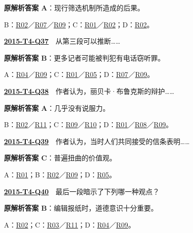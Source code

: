 \documentclass[11pt,a4paper]{article}
\begin{document}
\noindent\textbf{原解析答案 A}：现行筛选机制所造成的后果。\par\nopagebreak
\noindent B：\hyperref[cat-R02]{R02}／\hyperref[cat-R07]{R07}／\hyperref[cat-R09]{R09}；C：\hyperref[cat-R01]{R01}／\hyperref[cat-R02]{R02}；D：\hyperref[cat-R02]{R02}。\par\smallskip
{}\label{idx-2015-T4-Q37}\noindent\textbf{\href{https://zj139.github.io/math-notes/english/cdca5e792ad64d07196bc0ec/\#q37}{2015-T4-Q37}}　从第三段可以推断……\par\nopagebreak
\noindent\textbf{原解析答案 B}：更多记者可能被判犯有电话窃听罪。\par\nopagebreak
\noindent A：\hyperref[cat-R04]{R04}／\hyperref[cat-R09]{R09}；C：\hyperref[cat-R01]{R01}／\hyperref[cat-R05]{R05}；D：\hyperref[cat-R07]{R07}／\hyperref[cat-R09]{R09}。\par\smallskip
{}\label{idx-2015-T4-Q38}\noindent\textbf{\href{https://zj139.github.io/math-notes/english/cdca5e792ad64d07196bc0ec/\#q38}{2015-T4-Q38}}　作者认为，丽贝卡·布鲁克斯的辩护……\par\nopagebreak
\noindent\textbf{原解析答案 A}：几乎没有说服力。\par\nopagebreak
\noindent B：\hyperref[cat-R02]{R02}／\hyperref[cat-R11]{R11}；C：\hyperref[cat-R09]{R09}／\hyperref[cat-R10]{R10}；D：\hyperref[cat-R01]{R01}／\hyperref[cat-R08]{R08}／\hyperref[cat-R09]{R09}。\par\smallskip
{}\label{idx-2015-T4-Q39}\noindent\textbf{\href{https://zj139.github.io/math-notes/english/cdca5e792ad64d07196bc0ec/\#q39}{2015-T4-Q39}}　作者认为，当时人们共同接受的信条表明……\par\nopagebreak
\noindent\textbf{原解析答案 C}：普遍扭曲的价值观。\par\nopagebreak
\noindent A：\hyperref[cat-R01]{R01}；B：\hyperref[cat-R02]{R02}／\hyperref[cat-R09]{R09}；D：\hyperref[cat-R05]{R05}。\par\smallskip
{}\label{idx-2015-T4-Q40}\noindent\textbf{\href{https://zj139.github.io/math-notes/english/cdca5e792ad64d07196bc0ec/\#q40}{2015-T4-Q40}}　最后一段暗示了下列哪一种观点？\par\nopagebreak
\noindent\textbf{原解析答案 B}：编辑报纸时，道德意识十分重要。\par\nopagebreak
\noindent A：\hyperref[cat-R02]{R02}；C：\hyperref[cat-R03]{R03}／\hyperref[cat-R11]{R11}；D：\hyperref[cat-R04]{R04}／\hyperref[cat-R09]{R09}。\par\smallskip
\clearpage
\end{document}
